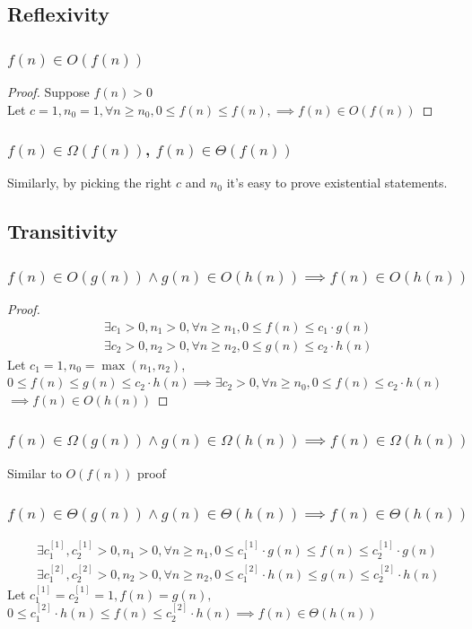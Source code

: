 \documentclass[9pt]{extarticle}
\begin{document}
\subsection{Reflexivity}
\subsubsection{$f(n)\in O(f(n))$}
\begin{proof}
    Suppose $f(n) > 0$\\
    Let $c = 1, n_0 = 1, \forall n \geq n_0, 0 \leq f(n) \leq f(n), \implies f(n) \in O(f(n))$
\end{proof}
\subsubsection{$f(n) \in \Omega(f(n))$, $f(n) \in \Theta(f(n))$}
Similarly, by picking the right $c$ and $n_0$ it's easy to prove existential statements.

\subsection{Transitivity}
\subsubsection{$f(n) \in O(g(n)) \land g(n) \in O(h(n)) \implies f(n) \in O(h(n))$}
\begin{proof}
    \begin{align*}
        &\exists c_1 > 0, n_1 > 0, \forall n \geq n_1, 0 \leq f(n) \leq c_1 \cdot g(n)\\
        &\exists c_2 > 0, n_2 > 0, \forall n \geq n_2, 0 \leq g(n) \leq c_2 \cdot h(n)
    \end{align*}
    Let $c_1 = 1, n_0 = \max(n_1, n_2)$, $0 \leq f(n) \leq g(n) \leq c_2 \cdot h(n) \implies \exists c_2 > 0, \forall n \geq n_0, 0 \leq f(n) \leq c_2 \cdot h(n)$\\
    $\implies f(n) \in O(h(n))$  
\end{proof}
\subsubsection{$f(n) \in \Omega(g(n)) \land g(n) \in \Omega(h(n)) \implies f(n) \in \Omega(h(n))$}
Similar to $O(f(n))$ proof
\subsubsection{$f(n) \in \Theta(g(n)) \land g(n) \in \Theta(h(n)) \implies f(n) \in \Theta(h(n))$}
\begin{align*}
    &\exists c_1^{[1]}, c_2^{[1]}> 0, n_1 > 0, \forall n \geq n_1, 0 \leq c_1^{[1]} \cdot g(n) \leq f(n) \leq c_2^{[1]} \cdot g(n)\\
    &\exists c_1^{[2]}, c_2^{[2]} > 0, n_2 > 0, \forall n \geq n_2, 0 \leq c_1^{[2]} \cdot h(n) \leq g(n) \leq c_2^{[2]} \cdot h(n)
\end{align*}
Let $c_1^{[1]} = c_2^{[1]} = 1, f(n) = g(n), $\\
$0 \leq c_1^{[2]} \cdot h(n) \leq f(n) \leq c_2^{[2]} \cdot h(n) \implies f(n) \in \Theta(h(n))$
\end{document}
